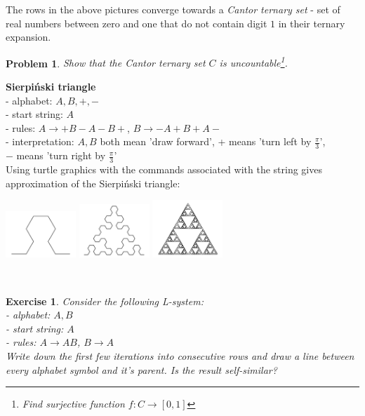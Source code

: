 \documentclass[12pt]{article}
\newtheorem{exercise}{Exercise}
\newtheorem{problem}{Problem}
\begin{document}
The rows in the above pictures converge towards a \emph{Cantor ternary set} - set of real numbers between zero and one that do not contain digit $1$ in their ternary expansion.
\begin{problem}
Show that the Cantor ternary set $C$ is uncountable\footnote{Find surjective function $f: C \rightarrow [0,1]$}.
\end{problem}
\noindent\textbf{Sierpiński triangle} \\
- alphabet: $A,B,+,-$\\
- start string: $A$\\
- rules: $A \rightarrow +B-A-B+$, $B \rightarrow -A+B+A-$\\
- interpretation: $A,B$ both mean 'draw forward', + means 'turn left by $\frac{\pi}{3}$',\\
\indent\indent\indent\indent\indent$-$ means 'turn right by $\frac{\pi}{3}$'\\
Using turtle graphics with the commands associated with the string gives approximation of the Sierpiński triangle:\\
\centerline{
\includegraphics[width = 100px]{sier1}
\includegraphics[width = 100px]{sier2}
\includegraphics[width = 100px]{sier3}}\\
\begin{exercise}
Consider the following L-system:\\
- alphabet: $A,B$\\
- start string: $A$\\
- rules: $A \rightarrow AB$, $B \rightarrow A$\\
Write down the first few iterations into consecutive rows and draw a line between every alphabet symbol and it's parent. Is the result self-similar? 
\end{exercise}
\end{document}
